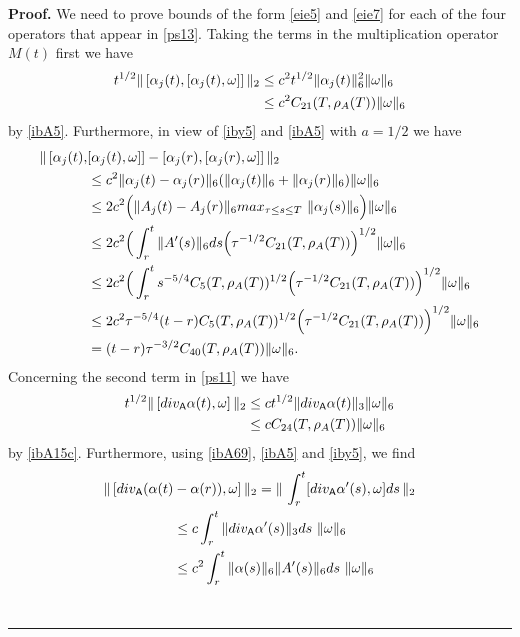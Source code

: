 \documentclass[12pt]{article}
\newenvironment{proof}[1][Proof]{\textbf{#1.} }{\ \rule{0.5em}{0.5em}}
\def \As{\mathsf{A}}
\def \w{\omega}
\def \eref{\eqref}
\numberwithin{equation}{section}
\begin{document}
        \begin{proof}   
  We need to prove  bounds of the form \eref{eie5}  and \eref{eie7} for
  each of the four operators that  appear in \eref{ps13}. Taking the terms in the multiplication
   operator $M(t)$ first we have  
  \begin{align}
  t^{1/2}\|\, [ \alpha_j(t), [\alpha_j(t), \w]]\, \|_2 &\le c^2 t^{1/2}\|\alpha_j(t)\|_6^2 \|\w\|_6 \notag\\
  &\le c^2 C_{21}(T, \rho_A(T))    \|\w\|_6    \label{eie9}
  \end{align}
  by \eref{ibA5}.     Furthermore, in view of \eref{iby5} and \eref{ibA5} with $a =1/2$ we have
  \begin{align}
  \|\, [ \alpha_j(t), &[\alpha_j(t), \w]] -  [ \alpha_j(r), [\alpha_j(r), \w]] \, \|_2        \notag \\
   & \le c^2 \|\alpha_j(t) - \alpha_j(r)\|_6 (\|\alpha_j(t)\|_6+\|\alpha_j(r)\|_6)\|\w\|_6       \notag\\
  &\le 2c^2\Big( \|A_j(t) - A_j(r) \|_6 max_{\tau \le s \le T} \ \|\alpha_j(s)\|_6\Big) \| \w\|_6  \notag\\
  &\le 2c^2\Big(\int_r^t \|A'(s)\|_6 ds  \Big( \tau^{-1/2} C_{21}(T, \rho_A(T))\Big)^{1/2}\| \w\|_6 \notag\\
  &\le 2c^2\Big(\int_r^t s^{-5/4} C_5(T, \rho_A(T))^{1/2} 
                \Big( \tau^{-1/2} C_{21}(T, \rho_A(T))\Big)^{1/2}\| \w\|_6   \notag\\
  &\le 2c^2 \tau^{-5/4} (t-r)  C_5(T, \rho_A(T))^{1/2}
                  \Big( \tau^{-1/2} C_{21}(T, \rho_A(T))\Big)^{1/2}\| \w\|_6 \notag\\
  &= (t-r) \tau^{-3/2} C_{40}(T, \rho_A(T))  \|\w\|_6.
  \end{align}   
Concerning the second term in \eref{ps11} we have  
  \begin{align}
  t^{1/2}\|\, [div_\As \alpha(t), \w]\, \|_2 &\le c t^{1/2} \|div_\As \alpha(t)\|_3 \|\w\|_6  \notag\\
  &    \le cC_{24}(T, \rho_A(T)) \|\w\|_6    
  \end{align}
  by \eref{ibA15c}. Furthermore, using \eref{ibA69}, \eref{ibA5} and \eref{iby5}, we find
  \begin{align*}
  \|\, [div_\As (\alpha(t)&-\alpha(r)), \w]\, \|_2 =  \|\,\int_r^t [div_\As \alpha'(s), \w]ds \, \|_2\notag\\
  &\le c \int_r^t \|div_\As \alpha'(s)\|_3 ds\ \|\w\|_6               \notag\\
  &\le c^2 \int_r^t \|\alpha(s)\|_6 \|A'(s)\|_6ds    \ \|\w\|_6 \notag\\

\end{align*}
\end{proof}
\end{document}

